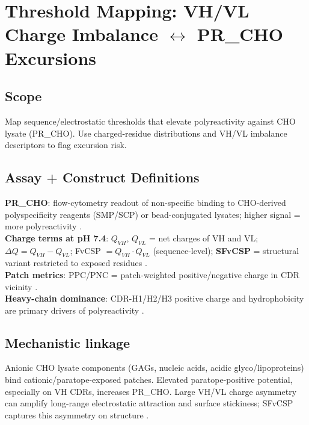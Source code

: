 \section*{Threshold Mapping: VH/VL Charge Imbalance $\leftrightarrow$ PR\_CHO Excursions}

\subsection*{Scope}
Map sequence/electrostatic thresholds that elevate polyreactivity against CHO lysate (PR\_CHO). Use charged-residue distributions and VH/VL imbalance descriptors to flag excursion risk.

\subsection*{Assay + Construct Definitions}
\textbf{PR\_CHO}: flow-cytometry readout of non-specific binding to CHO-derived polyspecificity reagents (SMP/SCP) or bead-conjugated lysates; higher signal = more polyreactivity \cite{huggingface_ginkgo_blog,makowski_psp,arsi_WP, xu_psr}.\\
\textbf{Charge terms at pH 7.4}: $Q_{VH}$, $Q_{VL}$ = net charges of VH and VL; $\Delta Q = Q_{VH}-Q_{VL}$; FvCSP $= Q_{VH}\cdot Q_{VL}$ (sequence-level); \textbf{SFvCSP} = structural variant restricted to exposed residues \cite{raybould_pnas2019, tap_site}.\\
\textbf{Patch metrics}: PPC/PNC = patch-weighted positive/negative charge in CDR vicinity \cite{raybould_pnas2019, tap_site}.\\
\textbf{Heavy-chain dominance}: CDR-H1/H2/H3 positive charge and hydrophobicity are primary drivers of polyreactivity \cite{chen_cellrep2024}.

\subsection*{Mechanistic linkage}
Anionic CHO lysate components (GAGs, nucleic acids, acidic glyco/lipoproteins) bind cationic/paratope-exposed patches. Elevated paratope-positive potential, especially on VH CDRs, increases PR\_CHO. Large VH/VL charge asymmetry can amplify long-range electrostatic attraction and surface stickiness; SFvCSP captures this asymmetry on structure \cite{cunningham_review, chen_cellrep2024, raybould_pnas2019}.

